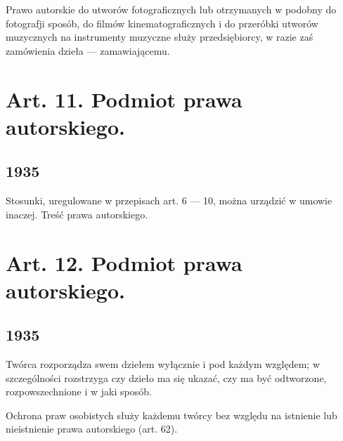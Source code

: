 \documentclass[withmarginpar]{book}
\begin{document}
Prawo autorskie do utworów fotograficznych lub otrzymanych w podobny
do fotografji sposób, do filmów kinematograficznych i do przeróbki
utworów muzycznych na instrumenty muzyczne służy przedsiębiorcy, w
razie zaś zamówienia dzieła — zamawiającemu.

\section{Art.  11. Podmiot prawa autorskiego.}
\label{sec:art.-11}

\subsection{1935}
\label{sec:art.-11-1}

Stosunki, uregulowane w przepisach art. 6 — 10, można urządzić w
umowie inaczej.  Treść prawa autorskiego.


\section{Art.  12. Podmiot prawa autorskiego.}
\label{sec:art.-12}

\subsection{1935}
\label{sec:art.-121-1}

Twórca rozporządza swem dziełem wyłącznie i pod każdym względem; w
szczególności rozstrzyga czy dzieło ma się ukazać, czy ma być
odtworzone, rozpowszechnione i w jaki sposób.

Ochrona praw osobistych służy każdemu twórcy bez względu na istnienie
lub nieistnienie prawa autorskiego (art. 62).
\end{document}
